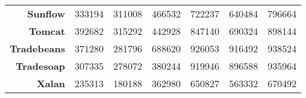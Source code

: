 \begin{table}[H]
{\begin{tabular}{rcccccc}
      \textbf{Sunflow}     & 333194           & 311008           & 466532           & 722237           & 640484           & 796664           \\
      \textbf{Tomcat}      & 392682           & 315292           & 442928           & 847140           & 690324           & 898144           \\
      \textbf{Tradebeans}  & 371280           & 281796           & 688620           & 926053           & 916492           & 938524           \\
      \textbf{Tradesoap}   & 307335           & 278072           & 380244           & 919946           & 896588           & 935964           \\
      \textbf{Xalan}       & 235313           & 180188           & 362980           & 650827           & 563332           & 670492          
    \end{tabular}
  }
\end{table}
